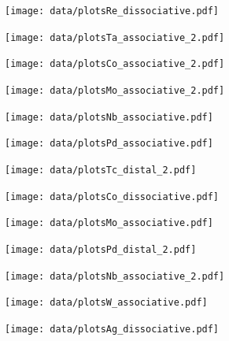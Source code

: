 \begin{figure}
\centering
\texttt{[image: data/plotsRe\_dissociative.pdf]}
\end{figure}

\begin{figure}
\centering
\texttt{[image: data/plotsTa\_associative\_2.pdf]}
\end{figure}

\begin{figure}
\centering
\texttt{[image: data/plotsCo\_associative\_2.pdf]}
\end{figure}

\begin{figure}
\centering
\texttt{[image: data/plotsMo\_associative\_2.pdf]}
\end{figure}

\begin{figure}
\centering
\texttt{[image: data/plotsNb\_associative.pdf]}
\end{figure}

\begin{figure}
\centering
\texttt{[image: data/plotsPd\_associative.pdf]}
\end{figure}

\begin{figure}
\centering
\texttt{[image: data/plotsTc\_distal\_2.pdf]}
\end{figure}

\begin{figure}
\centering
\texttt{[image: data/plotsCo\_dissociative.pdf]}
\end{figure}

\begin{figure}
\centering
\texttt{[image: data/plotsMo\_associative.pdf]}
\end{figure}

\begin{figure}
\centering
\texttt{[image: data/plotsPd\_distal\_2.pdf]}
\end{figure}

\begin{figure}
\centering
\texttt{[image: data/plotsNb\_associative\_2.pdf]}
\end{figure}

\begin{figure}
\centering
\texttt{[image: data/plotsW\_associative.pdf]}
\end{figure}

\begin{figure}
\centering
\texttt{[image: data/plotsAg\_dissociative.pdf]}
\end{figure}

